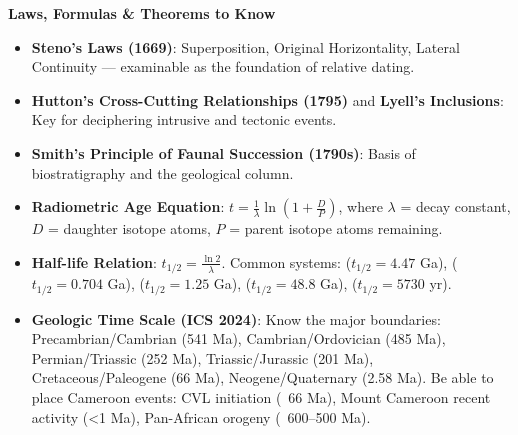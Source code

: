 \documentclass[11pt]{article}
\begin{document}
\begin{bilan}
\textbf{Laws, Formulas \& Theorems to Know}
\begin{itemize}
\item \textbf{Steno's Laws (1669)}: Superposition, Original Horizontality, Lateral Continuity — examinable as the foundation of relative dating.
\item \textbf{Hutton's Cross-Cutting Relationships (1795)} and \textbf{Lyell's Inclusions}: Key for deciphering intrusive and tectonic events.
\item \textbf{Smith's Principle of Faunal Succession (1790s)}: Basis of biostratigraphy and the geological column.
\item \textbf{Radiometric Age Equation}: $t = \frac{1}{\lambda} \ln\left(1 + \frac{D}{P}\right)$, where $\lambda$ = decay constant, $D$ = daughter isotope atoms, $P$ = parent isotope atoms remaining.
\item \textbf{Half-life Relation}: $t_{1/2} = \frac{\ln 2}{\lambda}$. Common systems:  ($t_{1/2}=4.47$ Ga),  ($t_{1/2}=0.704$ Ga),  ($t_{1/2}=1.25$ Ga),  ($t_{1/2}=48.8$ Ga),  ($t_{1/2}=5730$ yr).
\item \textbf{Geologic Time Scale (ICS 2024)}: Know the major boundaries: Precambrian/Cambrian (541 Ma), Cambrian/Ordovician (485 Ma), Permian/Triassic (252 Ma), Triassic/Jurassic (201 Ma), Cretaceous/Paleogene (66 Ma), Neogene/Quaternary (2.58 Ma). Be able to place Cameroon events: CVL initiation (~66 Ma), Mount Cameroon recent activity (<1 Ma), Pan-African orogeny (~600–500 Ma).
\end{itemize}


\end{bilan}
\end{document}
